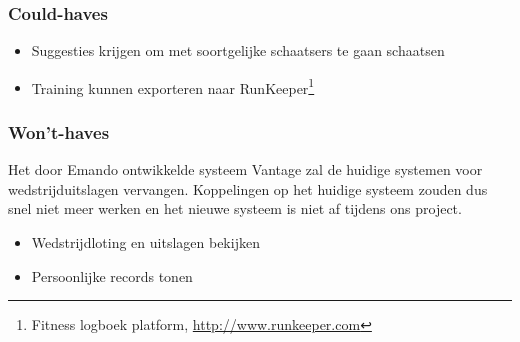 \subsubsection{Could-haves}

\begin{itemize} \parskip0pt 
    \item Suggesties krijgen om met soortgelijke schaatsers te gaan schaatsen
    \item Training kunnen exporteren naar RunKeeper\footnote{Fitness logboek platform, \url{http://www.runkeeper.com}}
\end{itemize}

\subsubsection{Won't-haves}

Het door Emando ontwikkelde systeem Vantage zal de huidige systemen voor wedstrijduitslagen vervangen. Koppelingen op het huidige systeem zouden dus snel niet meer werken en het nieuwe systeem is niet af tijdens ons project.
\begin{itemize} \parskip0pt 
    \item Wedstrijdloting en uitslagen bekijken
    \item Persoonlijke records tonen
\end{itemize}